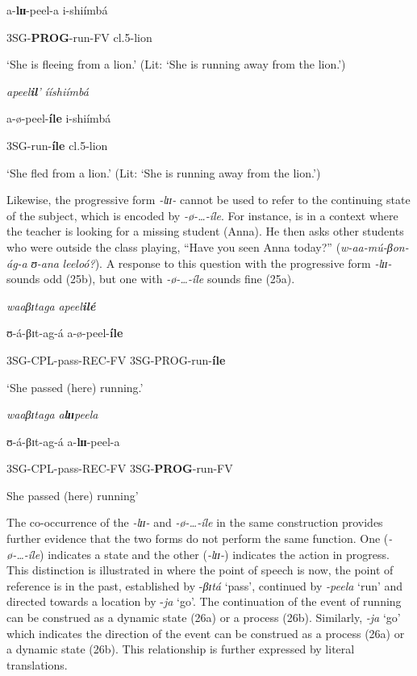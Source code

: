\documentclass[output=paper,newtxmath,modfonts,nonflat,draftmode]{langsci/langscibook}
\begin{document}
 a-\textbf{lɪɪ}-peel-a              i-shiímbá

 3SG-\textbf{PROG}-run-FV cl.5-lion

 ‘She is fleeing from a lion.’ (Lit: ‘She is running away from the lion.’)

\ex *\textit{apeel}\textbf{\textit{il}}\textit{’}       \textit{ííshiímbá}

   a-ø-peel-\textbf{íle} i-shiímbá

   3SG-run-\textbf{íle}   cl.5-lion

  ‘She fled from a lion.’ (Lit: ‘She is running away from the lion.’)
\z
\z

Likewise, the progressive form \textit{-lɪɪ}\textit{-} cannot be used to refer to the continuing state of the subject, which is encoded by \textit{-ø}\textit{-…-íle}. For instance,  is in a context where the teacher is looking for a missing student (Anna). He then asks other students who were outside the class playing, “Have you seen Anna today?” (\textit{w-aa-mú-βon-ág-a} \textit{ʊ-ana} \textit{leeloó?}). A response to this question with the progressive form \textit{-lɪɪ}\textit{-} sounds odd (25b), but one with \textit{-ø}\textit{-…-íle} sounds fine (25a).

\ea \label{ex:kanijo:25}
\ea \textit{waaβɪ}\textit{taga}                   \textit{apeel}\textbf{\textit{ilé}}

\textbf{    }ʊ-á-βɪt-ag-á                 a-ø-peel-\textbf{íle}

 3SG-CPL-pass-REC-FV 3SG-PROG-run-\textbf{íle}

 ‘She passed (here) running.’


\ex *\textit{waaβɪ}\textit{taga}                   \textit{a}\textbf{\textit{l}}\textbf{\textit{ɪɪ}}\textit{peela}

   ʊ-á-βɪt-ag-á                a-\textbf{lɪɪ}-peel-a

   3SG-CPL-pass-REC-FV 3SG-\textbf{PROG}-run-FV 

   She passed (here) running’
\z
\z

The co-occurrence of the \textit{-lɪɪ}\textit{-} and \textit{-ø}\textit{-…-íle} in the same construction provides further evidence that the two forms do not perform the same function. One (\textit{-ø}\textit{-…-íle}) indicates a state and the other (\textit{-lɪɪ}\textit{-}) indicates the action in progress. This distinction is illustrated in  where the point of speech is now, the point of reference is in the past, established by -\textit{βɪ}\textit{tá} ‘pass’, continued by \textit{-peela} ‘run’ and directed towards a location by -\textit{ja} ‘go’. The continuation of the event of running can be construed as a dynamic state (26a) or a process (26b). Similarly, \textit{-ja} ‘go’ which indicates the direction of the event can be construed as a process (26a) or a dynamic state (26b). This relationship is further expressed by literal translations. 
\end{document}

